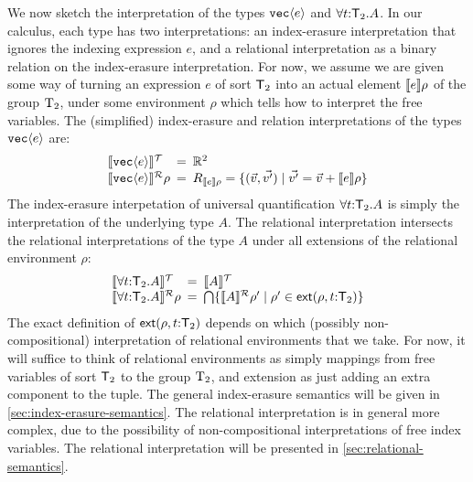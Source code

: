 We now sketch the interpretation of the types $\texttt{vec}\langle e \rangle$ and
$\forall t\mathord:\mathsf{T}_2.A$. In our calculus, each type has two
interpretations: an index-erasure interpretation that ignores the
indexing expression $e$, and a relational interpretation as a binary
relation on the index-erasure interpretation. For now, we assume we
are given some way of turning an expression $e$ of sort $\mathsf{T}_2$
into an actual element $\llbracket e \rrbracket\rho$ of the group $\mathrm{T}_2$, under
some environment $\rho$ which tells how to interpret the free
variables. The (simplified) index-erasure and relation interpretations
of the types $\texttt{vec}\langle e \rangle$ are:
\begin{displaymath}
  \begin{array}{l@{\hspace{0.5em}=\hspace{0.5em}}l}
    \tySem{\tyPrim{vec}{e}} & \mathbb{R}^2 \\
    \rsem{\tyPrim{vec}{e}}{}\rho & R_{\sem{e}\rho} = \{ (\vec{v},\vec{v'}) \sepbar \vec{v'} = \vec{v} + \sem{e}\rho \}
  \end{array}
\end{displaymath}
The index-erasure interpetation of universal quantification $\forall
t\mathord:\mathsf{T}_2.A$ is simply the interpretation of the
underlying type $A$. The relational interpretation intersects the
relational interpretations of the type $A$ under all extensions of the
relational environment $\rho$:
\begin{displaymath}
  \begin{array}{l@{\hspace{0.5em}=\hspace{0.5em}}l}
    \tySem{\forall t\mathord:\SynTransl{2}.A} & \tySem{A} \\
    \rsem{\forall t\mathord:\SynTransl{2}.A}{}\rho & \bigcap\{ \rsem{A}{}{\rho'} \sepbar \rho' \in \extends{\rho}{t\mathord:\SynTransl{2}} \}
  \end{array}
\end{displaymath}
The exact definition of $\mathsf{ext}(\rho,t\mathord:\mathsf{T}_2)$
depends on which (possibly non-compositional) interpretation of
relational environments that we take. For now, it will suffice to
think of relational environments as simply mappings from free
variables of sort $\mathsf{T}_2$ to the group $\mathrm{T}_2$, and
extension as just adding an extra component to the tuple. The general
index-erasure semantics will be given in
\autoref{sec:index-erasure-semantics}. The relational interpretation
is in general more complex, due to the possibility of
non-compositional interpretations of free index variables. The
relational interpretation will be presented in
\autoref{sec:relational-semantics}.


